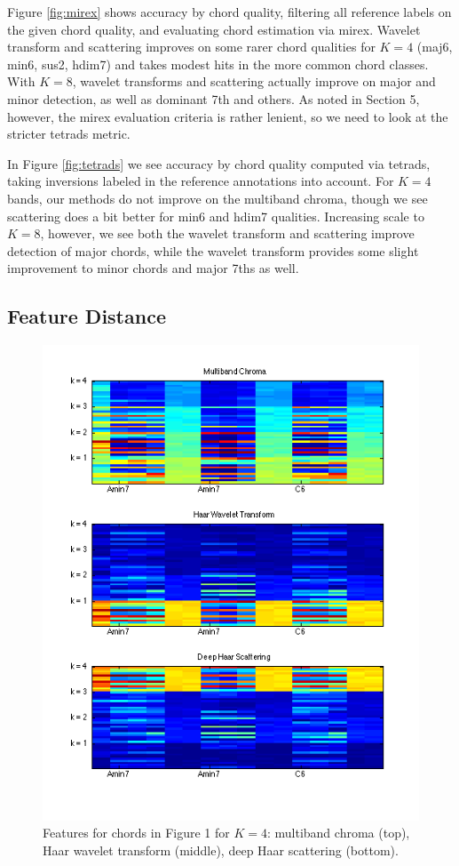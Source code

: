\documentclass{article}
\begin{document}
Figure \ref{fig:mirex} shows accuracy by chord quality, filtering all reference labels on the given chord quality, and evaluating chord estimation via mirex. Wavelet transform and scattering improves on some rarer chord qualities for $K=4$ (maj6, min6, sus2, hdim7) and takes modest hits in the more common chord classes. With $K=8$, wavelet transforms and scattering actually improve on major and minor detection, as well as dominant 7th and others. As noted in Section 5, however, the mirex evaluation criteria is rather lenient, so we need to look at the stricter tetrads metric.

In Figure \ref{fig:tetrads} we see accuracy by chord quality computed via tetrads, taking inversions labeled in the reference annotations into account. For $K=4$ bands, our methods do not improve on the multiband chroma, though we see scattering does a bit better for min6 and hdim7 qualities. Increasing scale to $K=8$, however, we see both the wavelet transform and scattering improve detection of major chords, while the wavelet transform provides some slight improvement to minor chords and major 7ths as well. 

\subsection{Feature Distance}

\begin{figure}
\centering
\includegraphics[width=\columnwidth]{figs/features.png}
\caption{Features for chords in Figure 1 for $K=4$: multiband chroma (top), Haar wavelet transform (middle), deep Haar scattering (bottom).}
\label{fig:features}
\end{figure}
\end{document}
